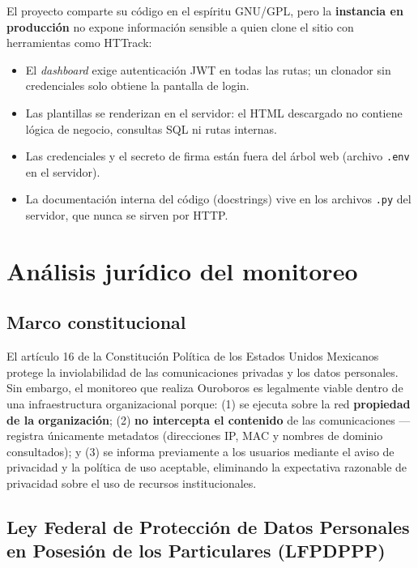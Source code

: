 \documentclass[12pt,letterpaper]{report}
\begin{document}
El proyecto comparte su código en el espíritu GNU/GPL, pero la
\textbf{instancia en producción} no expone información sensible a quien
clone el sitio con herramientas como HTTrack:

\begin{itemize}[nosep]
  \item El \textit{dashboard} exige autenticación JWT en todas las rutas;
        un clonador sin credenciales solo obtiene la pantalla de login.
  \item Las plantillas se renderizan en el servidor: el HTML descargado no
        contiene lógica de negocio, consultas SQL ni rutas internas.
  \item Las credenciales y el secreto de firma están fuera del árbol web
        (archivo \texttt{.env} en el servidor).
  \item La documentación interna del código (docstrings) vive en los
        archivos \texttt{.py} del servidor, que nunca se sirven por HTTP.
\end{itemize}

\chapter{Análisis jurídico del monitoreo}

\section{Marco constitucional}

El artículo 16 de la Constitución Política de los Estados Unidos Mexicanos
protege la inviolabilidad de las comunicaciones privadas y los datos
personales. Sin embargo, el monitoreo que realiza Ouroboros es legalmente
viable dentro de una infraestructura organizacional porque: (1) se ejecuta
sobre la red \textbf{propiedad de la organización}; (2) \textbf{no
intercepta el contenido} de las comunicaciones --- registra únicamente
metadatos (direcciones IP, MAC y nombres de dominio consultados); y (3) se
informa previamente a los usuarios mediante el aviso de privacidad y la
política de uso aceptable, eliminando la expectativa razonable de privacidad
sobre el uso de recursos institucionales.

\section{Ley Federal de Protección de Datos Personales en Posesión de los
Particulares (LFPDPPP)}
\end{document}
